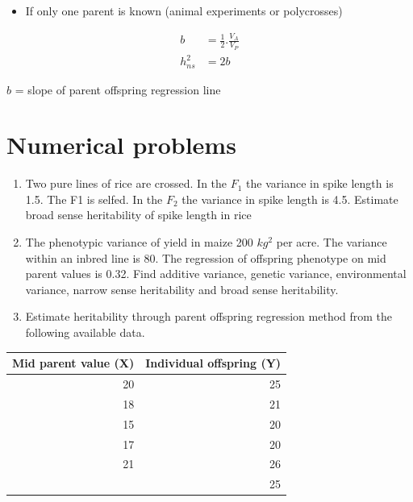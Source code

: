 \documentclass[11pt,dvipsnames,ignorenonframetext,aspectratio=169]{beamer}
\providecommand{\tightlist}{%
  \setlength{\itemsep}{0pt}\setlength{\parskip}{0pt}}
\begin{document}
\begin{frame}{}
\protect\hypertarget{section-20}{}
\begin{itemize}
\tightlist
\item
  If only one parent is known (animal experiments or polycrosses)
\end{itemize}

\[
\begin{aligned} 
b &= \frac{1}{2}.\frac{V_A}{V_P} \\ 
h_{ns}^2 &= 2b 
\end{aligned}
\]

\(b\) = slope of parent offspring regression line
\end{frame}

\hypertarget{numerical-problems}{%
\section{Numerical problems}\label{numerical-problems}}

\begin{frame}{}
\protect\hypertarget{section-21}{}
\begin{enumerate}
\item
  Two pure lines of rice are crossed. In the \(F_1\) the variance in
  spike length is 1.5. The F1 is selfed. In the \(F_2\) the variance in
  spike length is 4.5. Estimate broad sense heritability of spike length
  in rice
\item
  The phenotypic variance of yield in maize 200 \(kg^2\) per acre. The
  variance within an inbred line is 80. The regression of offspring
  phenotype on mid parent values is 0.32. Find additive variance,
  genetic variance, environmental variance, narrow sense heritability
  and broad sense heritability.
\end{enumerate}
\end{frame}

\begin{frame}{}
\protect\hypertarget{section-22}{}
\begin{enumerate}
\setcounter{enumi}{2}
\tightlist
\item
  Estimate heritability through parent offspring regression method from
  the following available data.
\end{enumerate}

\begin{table}
\centering\begingroup\fontsize{6}{8}\selectfont

\begin{tabular}{rr}
\toprule
Mid parent value (X) & Individual offspring (Y)\\
\midrule
20 & 25\\
18 & 21\\
15 & 20\\
17 & 20\\
21 & 26\\
\addlinespace
22 & 25\\
\bottomrule
\end{tabular}
\endgroup{}
\end{table}
\end{frame}
\end{document}
